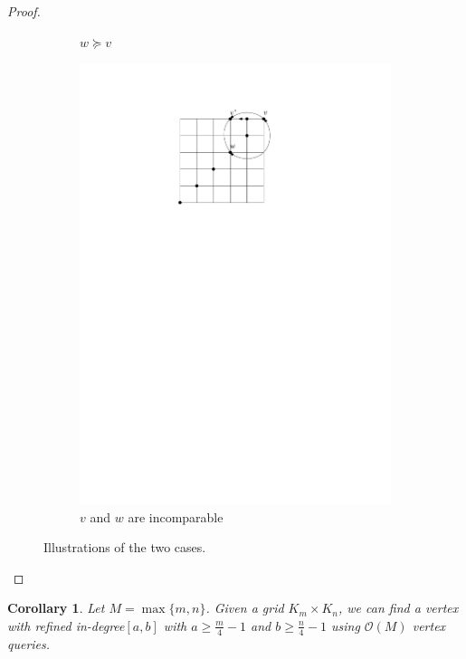 \documentclass[a4paper,10pt]{article}
\newtheorem{corollary}{Corollary}
\newcommand{\indegree}{refined in-degree\xspace}
\begin{document}
\begin{proof}
\begin{figure}[htbp]
\begin{subfigure}[b]{0.4\textwidth}
           \caption{$w \succeq v$}
       \end{subfigure}
       \qquad \qquad
       \begin{subfigure}[b]{0.4\textwidth}
           \includegraphics[scale = 0.7]{seedlemma_fig2_cas2.pdf}
           \caption{$v$ and $w$ are incomparable}
       \end{subfigure}
       \caption{Illustrations of the two cases. }
       \label{fig:seedlem2}
   \end{figure}
\end{proof}

\begin{corollary}\label{corollary: n/4 indegree}
 Let $M = \max\{m,n\}$. Given a grid $K_{m} \times K_{n}$, we can find a vertex with \indegree $[a,b]$ with $a \geq \frac{m}{4} - 1$ and  $b \geq \frac{n}{4} - 1$ using $\mathcal{O}(M)$ vertex queries.
\end{corollary}
\end{document}
